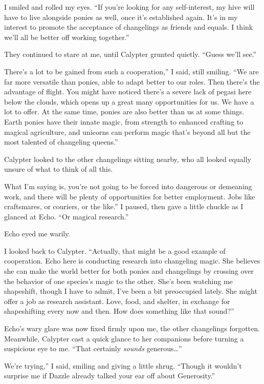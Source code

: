 I smiled and rolled my eyes. “If you’re looking for any self-interest, my hive will have to live alongside ponies as well, once it’s established again. It’s in my interest to promote the acceptance of changelings as friends and equals. I think we’ll all be better off working together.”

They continued to stare at me, until Calypter grunted quietly. “Guess we’ll see.”

\leavevmode{}There’s a lot to be gained from such a cooperation,” I said, still smiling. “We are far more versatile than ponies, able to adapt better to our roles. Then there’s the advantage of flight. You might have noticed there’s a severe lack of pegasi here below the clouds, which opens up a great many opportunities for us. We have a lot to offer. At the same time, ponies are also better than us at some things. Earth ponies have their innate magic, from strength to enhanced crafting to magical agriculture, and unicorns can perform magic that’s beyond all but the most talented of changeling queens.”

Calypter looked to the other changelings sitting nearby, who all looked equally unsure of what to think of all this.

\leavevmode{}What I’m saying is, you’re not going to be forced into dangerous or demeaning work, and there will be plenty of opportunities for better employment. Jobs like craftsmares, or couriers, or the like.” I paused, then gave a little chuckle as I glanced at Echo. “Or magical research.”

Echo eyed me warily.

I looked back to Calypter. “Actually, that might be a good example of cooperation. Echo here is conducting research into changeling magic. She believes she can make the world better for both ponies and changelings by crossing over the behavior of one species’s magic to the other. She’s been watching me shapeshift, though I have to admit, I’ve been a bit preoccupied lately. She might offer a job as research assistant. Love, food, and shelter, in exchange for shapeshifting every now and then. How does something like that sound?”

Echo’s wary glare was now fixed firmly upon me, the other changelings forgotten. Meanwhile, Calypter cast a quick glance to her companions before turning a suspicious eye to me. “That certainly \textit{sounds} generous…”

\leavevmode{}We’re trying,” I said, smiling and giving a little shrug. “Though it wouldn’t surprise me if Dazzle already talked your ear off about Generosity.”

